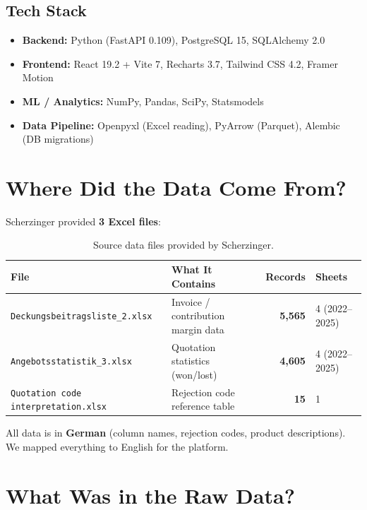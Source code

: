 \documentclass[11pt,a4paper]{article}
\newcommand{\code}[1]{\texttt{#1}}
\begin{document}
\subsection{Tech Stack}
\begin{itemize}[nosep]
  \item \textbf{Backend:} Python (FastAPI 0.109), PostgreSQL 15, SQLAlchemy 2.0
  \item \textbf{Frontend:} React 19.2 + Vite 7, Recharts 3.7, Tailwind CSS 4.2, Framer Motion
  \item \textbf{ML / Analytics:} NumPy, Pandas, SciPy, Statsmodels
  \item \textbf{Data Pipeline:} Openpyxl (Excel reading), PyArrow (Parquet), Alembic (DB migrations)
\end{itemize}

\section{Where Did the Data Come From?}

Scherzinger provided \textbf{3 Excel files}:

\begin{table}[H]
\centering
\begin{tabularx}{\textwidth}{l X r l}
\toprule
\textbf{File} & \textbf{What It Contains} & \textbf{Records} & \textbf{Sheets} \\
\midrule
\code{Deckungsbeitragsliste\_2.xlsx} & Invoice / contribution margin data & \textbf{5{,}565} & 4 (2022--2025) \\
\code{Angebotsstatistik\_3.xlsx} & Quotation statistics (won/lost) & \textbf{4{,}605} & 4 (2022--2025) \\
\code{Quotation code interpretation.xlsx} & Rejection code reference table & \textbf{15} & 1 \\
\bottomrule
\end{tabularx}
\caption{Source data files provided by Scherzinger.}
\end{table}

All data is in \textbf{German} (column names, rejection codes, product descriptions). We mapped everything to English for the platform.

\section{What Was in the Raw Data?}
\end{document}
